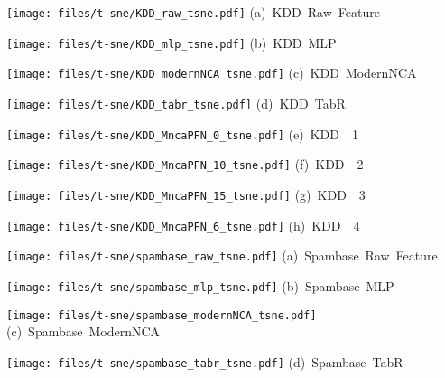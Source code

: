 \begin{figure*}[t]
    \begin{minipage}{0.24\linewidth}
    \texttt{[image: files/t-sne/KDD\_raw\_tsne.pdf]}
    \centering
    {\small \mbox{(a) {KDD  Raw Feature}}}
    \end{minipage}
    \begin{minipage}{0.24\linewidth}
    \texttt{[image: files/t-sne/KDD\_mlp\_tsne.pdf]}
    \centering
    {\small \mbox{(b) {KDD  MLP}}}
    \end{minipage}
    \begin{minipage}{0.24\linewidth}
    \texttt{[image: files/t-sne/KDD\_modernNCA\_tsne.pdf]}
    \centering
    {\small \mbox{(c) {KDD  ModernNCA}}}
    \end{minipage}
    \begin{minipage}{0.24\linewidth}
    \texttt{[image: files/t-sne/KDD\_tabr\_tsne.pdf]}
    \centering
    {\small \mbox{(d) {KDD  TabR}}}
    \end{minipage} 

    \begin{minipage}{0.24\linewidth}
    \texttt{[image: files/t-sne/KDD\_MncaPFN\_0\_tsne.pdf]}
    \centering
    {\small \mbox{(e) {KDD  \name~1}}}
    \end{minipage}
    \begin{minipage}{0.24\linewidth}
    \texttt{[image: files/t-sne/KDD\_MncaPFN\_10\_tsne.pdf]}
    \centering
    {\small \mbox{(f) {KDD  \name~2}}}
    \end{minipage}
    \begin{minipage}{0.24\linewidth}
    \texttt{[image: files/t-sne/KDD\_MncaPFN\_15\_tsne.pdf]}
    \centering
    {\small \mbox{(g) {KDD  \name~3}}}
    \end{minipage}
    \begin{minipage}{0.24\linewidth}
    \texttt{[image: files/t-sne/KDD\_MncaPFN\_6\_tsne.pdf]}
    \centering
    {\small \mbox{(h) {KDD  \name~4}}}
    \end{minipage}   


    \begin{minipage}{0.24\linewidth}
    \texttt{[image: files/t-sne/spambase\_raw\_tsne.pdf]}
    \centering
    {\small \mbox{(a) {Spambase Raw Feature}}}
    \end{minipage}
    \begin{minipage}{0.24\linewidth}
    \texttt{[image: files/t-sne/spambase\_mlp\_tsne.pdf]}
    \centering
    {\small \mbox{(b) {Spambase MLP}}}
    \end{minipage}
    \begin{minipage}{0.24\linewidth}
    \texttt{[image: files/t-sne/spambase\_modernNCA\_tsne.pdf]}
    \centering
    {\small \mbox{(c) {Spambase ModernNCA}}}
    \end{minipage}
    \begin{minipage}{0.24\linewidth}
    \texttt{[image: files/t-sne/spambase\_tabr\_tsne.pdf]}
    \centering
    {\small \mbox{(d) {Spambase TabR}}}
    \end{minipage} 


\end{figure*}
